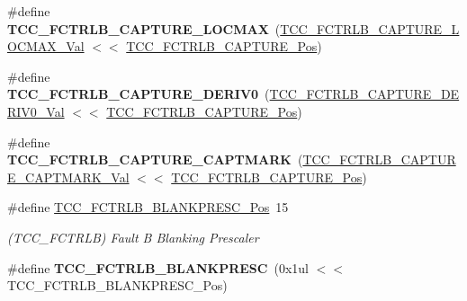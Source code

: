 \begin{DoxyCompactItemize}
\item 
\hypertarget{group___s_a_m_l21___t_c_c_ga26d25913638c51ec558cb92dbd4b8957}{}\#define {\bfseries T\+C\+C\+\_\+\+F\+C\+T\+R\+L\+B\+\_\+\+C\+A\+P\+T\+U\+R\+E\+\_\+\+L\+O\+C\+M\+A\+X}~(\hyperlink{group___s_a_m_l21___t_c_c_ga23f48658bf316c44b4a09628d76d16d2}{T\+C\+C\+\_\+\+F\+C\+T\+R\+L\+B\+\_\+\+C\+A\+P\+T\+U\+R\+E\+\_\+\+L\+O\+C\+M\+A\+X\+\_\+\+Val} $<$$<$ \hyperlink{group___s_a_m_l21___t_c_c_gaf72ca0ec9e27e86144624bfb8d4ac36b}{T\+C\+C\+\_\+\+F\+C\+T\+R\+L\+B\+\_\+\+C\+A\+P\+T\+U\+R\+E\+\_\+\+Pos})\label{group___s_a_m_l21___t_c_c_ga26d25913638c51ec558cb92dbd4b8957}

\item 
\hypertarget{group___s_a_m_l21___t_c_c_ga53b5c23c2537bfb56e8461711545e8d5}{}\#define {\bfseries T\+C\+C\+\_\+\+F\+C\+T\+R\+L\+B\+\_\+\+C\+A\+P\+T\+U\+R\+E\+\_\+\+D\+E\+R\+I\+V0}~(\hyperlink{group___s_a_m_l21___t_c_c_gad108279367c9aaaa43013809242961b8}{T\+C\+C\+\_\+\+F\+C\+T\+R\+L\+B\+\_\+\+C\+A\+P\+T\+U\+R\+E\+\_\+\+D\+E\+R\+I\+V0\+\_\+\+Val} $<$$<$ \hyperlink{group___s_a_m_l21___t_c_c_gaf72ca0ec9e27e86144624bfb8d4ac36b}{T\+C\+C\+\_\+\+F\+C\+T\+R\+L\+B\+\_\+\+C\+A\+P\+T\+U\+R\+E\+\_\+\+Pos})\label{group___s_a_m_l21___t_c_c_ga53b5c23c2537bfb56e8461711545e8d5}

\item 
\hypertarget{group___s_a_m_l21___t_c_c_ga78a1f21803895885e76cf733534d87ec}{}\#define {\bfseries T\+C\+C\+\_\+\+F\+C\+T\+R\+L\+B\+\_\+\+C\+A\+P\+T\+U\+R\+E\+\_\+\+C\+A\+P\+T\+M\+A\+R\+K}~(\hyperlink{group___s_a_m_l21___t_c_c_gacacf825e5ba84c658fd49b72ffc7aa00}{T\+C\+C\+\_\+\+F\+C\+T\+R\+L\+B\+\_\+\+C\+A\+P\+T\+U\+R\+E\+\_\+\+C\+A\+P\+T\+M\+A\+R\+K\+\_\+\+Val} $<$$<$ \hyperlink{group___s_a_m_l21___t_c_c_gaf72ca0ec9e27e86144624bfb8d4ac36b}{T\+C\+C\+\_\+\+F\+C\+T\+R\+L\+B\+\_\+\+C\+A\+P\+T\+U\+R\+E\+\_\+\+Pos})\label{group___s_a_m_l21___t_c_c_ga78a1f21803895885e76cf733534d87ec}

\item 
\hypertarget{group___s_a_m_l21___t_c_c_ga222f5a5c2084fb73ef2c0c8c7a040c45}{}\#define \hyperlink{group___s_a_m_l21___t_c_c_ga222f5a5c2084fb73ef2c0c8c7a040c45}{T\+C\+C\+\_\+\+F\+C\+T\+R\+L\+B\+\_\+\+B\+L\+A\+N\+K\+P\+R\+E\+S\+C\+\_\+\+Pos}~15\label{group___s_a_m_l21___t_c_c_ga222f5a5c2084fb73ef2c0c8c7a040c45}

\begin{DoxyCompactList}\small\item\em (T\+C\+C\+\_\+\+F\+C\+T\+R\+L\+B) Fault B Blanking Prescaler \end{DoxyCompactList}\item 
\hypertarget{group___s_a_m_l21___t_c_c_ga986efd80a8104568bcb4d9047ae8d622}{}\#define {\bfseries T\+C\+C\+\_\+\+F\+C\+T\+R\+L\+B\+\_\+\+B\+L\+A\+N\+K\+P\+R\+E\+S\+C}~(0x1ul $<$$<$ T\+C\+C\+\_\+\+F\+C\+T\+R\+L\+B\+\_\+\+B\+L\+A\+N\+K\+P\+R\+E\+S\+C\+\_\+\+Pos)\label{group___s_a_m_l21___t_c_c_ga986efd80a8104568bcb4d9047ae8d622}


\end{DoxyCompactItemize}
